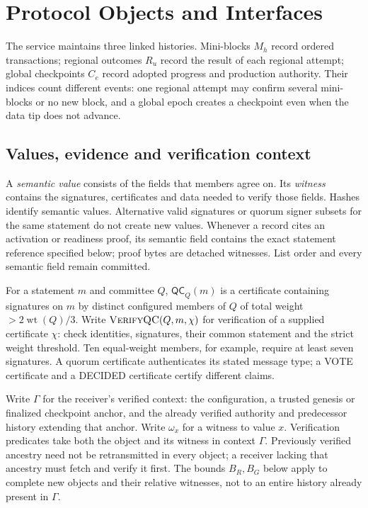 \documentclass[11pt,a4paper,onecolumn]{article}
\newcommand{\QC}{\mathsf{QC}}
\newcommand{\wt}{\operatorname{wt}}
\newcommand{\Proc}[1]{\textnormal{\textsc{#1}}}
\theoremstyle{remark}\newtheorem{example}[definition]{Example}
\begin{document}
\section{Protocol Objects and Interfaces}\label{sec:objects}
The service maintains three linked histories. Mini-blocks $M_h$ record ordered
transactions; regional outcomes $R_u$ record the result of each regional
attempt; global checkpoints $C_e$ record adopted progress and production
authority. Their indices count different events: one regional attempt may
confirm several mini-blocks or no new block, and a global epoch creates a
checkpoint even when the data tip does not advance.

\subsection{Values, evidence and verification context}\label{sec:objectconventions}
A \emph{semantic value} consists of the fields that members agree on. Its
\emph{witness} contains the signatures, certificates and data needed to verify
those fields. Hashes identify semantic values. Alternative valid signatures
or quorum signer subsets for the same statement do not create new values.
Whenever a record cites an activation or readiness proof, its semantic field
contains the exact statement reference specified below; proof bytes are
detached witnesses. List order and every semantic field remain committed.

For a statement $m$ and committee $Q$, $\QC_Q(m)$ is a certificate containing
signatures on $m$ by distinct configured members of $Q$ of total weight
$>2\wt(Q)/3$. Write $\Proc{VerifyQC}(Q,m,\chi)$ for verification of a supplied
certificate $\chi$: check identities, signatures, their common statement and
the strict weight threshold. Ten equal-weight members, for example, require
at least seven signatures. A quorum certificate authenticates its stated
message type; a VOTE certificate and a DECIDED certificate certify different
claims.

Write $\Gamma$ for the receiver's verified context: the configuration, a trusted
genesis or finalized checkpoint anchor, and the already verified authority and
predecessor history extending that anchor. Write $\omega_x$ for a witness to
value $x$. Verification predicates take both the object and its witness in
context $\Gamma$. Previously verified ancestry need not be retransmitted in
every object; a receiver lacking that ancestry must fetch and verify it first.
The bounds $B_R,B_G$ below apply to complete new objects and their relative
witnesses, not to an entire history already present in $\Gamma$.
\end{document}
